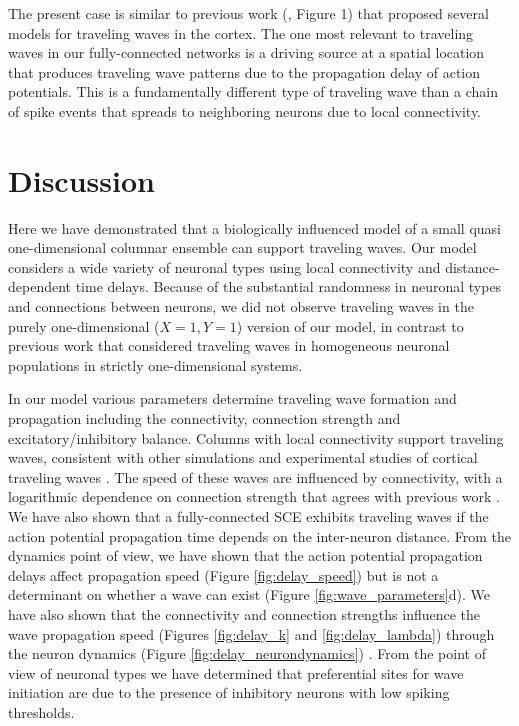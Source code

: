 \documentclass[12pt]{article}
\begin{document}
The present case is similar to previous work (\parencite{ermentrout2001}, Figure 1) that proposed several models for traveling waves in the cortex.
The one most relevant to traveling waves in our fully-connected networks is a driving source at a spatial location that produces traveling wave patterns due to the propagation delay of action potentials.
This is a fundamentally different type of traveling wave than a chain of spike events that spreads to neighboring neurons due to local connectivity.

\section{Discussion}
\color{red} 
Here we have demonstrated that a biologically influenced model of a small quasi one-dimensional columnar ensemble  can support traveling waves. 
Our model considers a wide variety of neuronal types using local connectivity and distance-dependent time delays.
Because of the substantial randomness in neuronal types and connections between neurons, we did not observe traveling waves in the purely one-dimensional ($X=1,Y=1$) version of our model, in contrast to previous work that considered traveling waves in homogeneous neuronal populations in strictly one-dimensional systems. 
\color{black}

\color{red} In our model \color{black} various parameters determine traveling wave formation and propagation including the connectivity, connection strength \color{red}and \color{black} excitatory/inhibitory balance.
Columns with local connectivity support traveling waves, consistent with other simulations and experimental studies of cortical traveling waves \color{red}\parencite{Kopell1986}\parencite{ermentrout2001}\parencite{Golomb1999} \color{black}.
\color{red}
The speed of these waves are influenced by connectivity, with a logarithmic dependence on connection strength that agrees with previous work \parencite{Golomb1996}\parencite{Golomb1999}.
\color{black}
We have also shown that  a fully-connected SCE exhibits traveling waves if the action potential propagation time depends on the inter-neuron distance. 
\color{red}
From the dynamics point of view, we have shown that the action potential propagation delays affect propagation speed (Figure \ref{fig:delay_speed}) but is not a determinant on whether a wave can exist (Figure \ref{fig:wave_parameters}d).
\color{black}
\color{red} We have also shown that \color{black} the connectivity and connection strengths influence the wave propagation speed \color{red}(Figures \ref{fig:delay_k} and \ref{fig:delay_lambda}) \color{black} through the neuron dynamics \color{red}(Figure \ref{fig:delay_neurondynamics}) \color{black}.
\color{red} From the point of view of neuronal types \color{black} we have determined that preferential sites for wave initiation are due to the presence of inhibitory neurons with low spiking thresholds.
\end{document}
